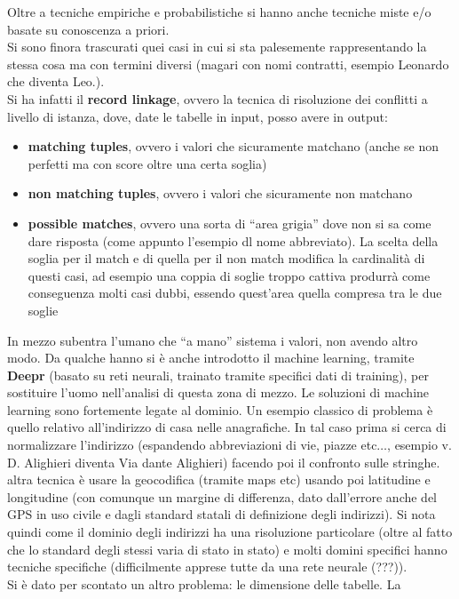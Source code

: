 \documentclass[a4paper,12pt, oneside]{book}
\begin{document}
Oltre a tecniche empiriche e probabilistiche si hanno anche tecniche miste e/o
basate su conoscenza a priori.\\
Si sono finora trascurati quei casi in cui si sta palesemente rappresentando la
stessa cosa ma con termini diversi (magari con nomi contratti, esempio Leonardo
che diventa Leo.). \\
Si ha infatti il \textbf{record linkage}, ovvero la tecnica di risoluzione dei
conflitti a livello di istanza, dove, date le tabelle in input, posso avere in
output: 
\begin{itemize}
  \item \textbf{matching tuples}, ovvero i valori che sicuramente matchano
  (anche se non perfetti ma con score oltre una certa soglia)
  \item \textbf{non matching tuples}, ovvero i valori che sicuramente non
  matchano
  \item \textbf{possible matches}, ovvero una sorta di ``area grigia'' dove non
  si sa come dare risposta (come appunto l'esempio dl nome abbreviato). La
  scelta della soglia per il match e di quella per il non match modifica la
  cardinalità di questi casi, ad  esempio una coppia di soglie troppo cattiva
  produrrà come conseguenza molti casi dubbi, essendo quest'area quella compresa
  tra le due soglie
\end{itemize}
In mezzo subentra l'umano che ``a mano'' sistema i valori, non avendo altro
modo. Da qualche hanno si è anche introdotto il machine learning, tramite
\textbf{Deepr} (basato su reti neurali, trainato tramite specifici dati di
training), per sostituire l'uomo nell'analisi di questa zona di mezzo. Le
soluzioni di machine learning sono fortemente legate al dominio. Un esempio
classico di problema è quello relativo all'indirizzo di casa nelle
anagrafiche. In tal caso prima si cerca di normalizzare l'indirizzo (espandendo
abbreviazioni di vie, piazze etc$\ldots$, esempio v. D. Alighieri diventa Via
dante Alighieri) facendo poi il confronto sulle stringhe. altra tecnica è
usare la geocodifica (tramite maps etc) usando poi latitudine e longitudine (con
comunque un margine di differenza, dato dall'errore anche del GPS in uso
civile e dagli standard statali di definizione degli indirizzi). Si nota quindi
come il dominio degli indirizzi ha una risoluzione 
particolare (oltre al fatto che lo standard degli stessi varia di stato in
stato) e molti domini specifici hanno tecniche specifiche (difficilmente 
apprese tutte da una rete neurale (???)). \\
Si è dato per scontato un altro problema: le dimensione delle tabelle. La
\end{document}
